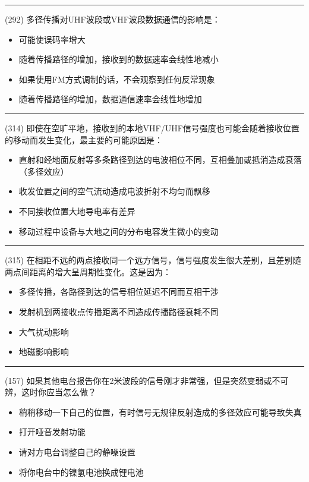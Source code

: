 \documentclass[twocolumn,hyperref,UTF8]{ctexart}  %
\begin{document}
\noindent\rule{0.5\textwidth}{1pt}
\heiti (292) 多径传播对UHF波段或VHF波段数据通信的影响是： \songti {\color{gray} [LK1104] }
\begin{itemize}
	\item  可能使误码率增大
	\item  随着传播路径的增加，接收到的数据速率会线性地减小
	\item  如果使用FM方式调制的话，不会观察到任何反常现象
	\item  随着传播路径的增加，数据通信速率会线性地增加
\end{itemize}


\noindent\rule{0.5\textwidth}{1pt}
\heiti (314) 即使在空旷平地，接收到的本地VHF/UHF信号强度也可能会随着接收位置的移动而发生变化，最主要的可能原因是： \songti {\color{gray} [LK0971] }
\begin{itemize}
	\item  直射和经地面反射等多条路径到达的电波相位不同，互相叠加或抵消造成衰落（多径效应）
	\item  收发位置之间的空气流动造成电波折射不均匀而飘移
	\item  不同接收位置大地导电率有差异
	\item  移动过程中设备与大地之间的分布电容发生微小的变动
\end{itemize}


\noindent\rule{0.5\textwidth}{1pt}
\heiti (315) 在相距不远的两点接收同一个远方信号，信号强度发生很大差别，且差别随两点间距离的增大呈周期性变化。这是因为： \songti {\color{gray} [LK1065] }
\begin{itemize}
	\item  多径传播，各路径到达的信号相位延迟不同而互相干涉
	\item  发射机到两接收点传播距离不同造成传播路径衰耗不同
	\item  大气扰动影响
	\item  地磁影响影响
\end{itemize}


\noindent\rule{0.5\textwidth}{1pt}
\heiti (157) 如果其他电台报告你在2米波段的信号刚才非常强，但是突然变弱或不可辨，这时你应当怎么做？ \songti {\color{gray} [LK1102] }
\begin{itemize}
	\item  稍稍移动一下自己的位置，有时信号无规律反射造成的多径效应可能导致失真
	\item  打开哑音发射功能
	\item  请对方电台调整自己的静噪设置
	\item  将你电台中的镍氢电池换成锂电池
\end{itemize}
\end{document}
